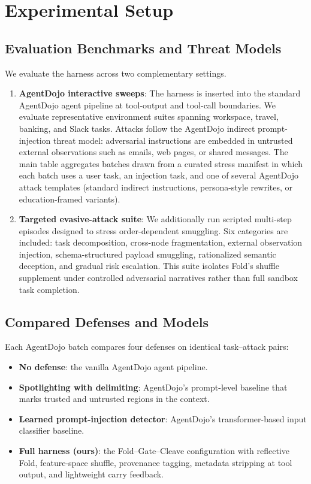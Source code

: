 \section{Experimental Setup}

\subsection{Evaluation Benchmarks and Threat Models}

We evaluate the harness across two complementary settings.

\begin{enumerate}
    \item \textbf{AgentDojo interactive sweeps}: The harness is inserted into the standard AgentDojo agent pipeline at tool-output and tool-call boundaries. We evaluate representative environment suites spanning workspace, travel, banking, and Slack tasks. Attacks follow the AgentDojo indirect prompt-injection threat model: adversarial instructions are embedded in untrusted external observations such as emails, web pages, or shared messages. The main table aggregates batches drawn from a curated stress manifest in which each batch uses a user task, an injection task, and one of several AgentDojo attack templates (standard indirect instructions, persona-style rewrites, or education-framed variants).
    \item \textbf{Targeted evasive-attack suite}: We additionally run scripted multi-step episodes designed to stress order-dependent smuggling. Six categories are included: task decomposition, cross-node fragmentation, external observation injection, schema-structured payload smuggling, rationalized semantic deception, and gradual risk escalation. This suite isolates Fold's shuffle supplement under controlled adversarial narratives rather than full sandbox task completion.
\end{enumerate}

\subsection{Compared Defenses and Models}

Each AgentDojo batch compares four defenses on identical task--attack pairs:
\begin{itemize}
    \item \textbf{No defense}: the vanilla AgentDojo agent pipeline.
    \item \textbf{Spotlighting with delimiting}: AgentDojo's prompt-level baseline that marks trusted and untrusted regions in the context.
    \item \textbf{Learned prompt-injection detector}: AgentDojo's transformer-based input classifier baseline.
    \item \textbf{Full harness (ours)}: the Fold--Gate--Cleave configuration with reflective Fold, feature-space shuffle, provenance tagging, metadata stripping at tool output, and lightweight carry feedback.
\end{itemize}

